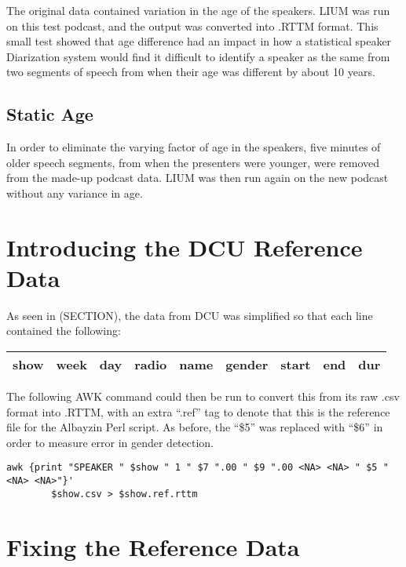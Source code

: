 The original data contained variation in the age of the speakers. LIUM was run on this test podcast, and the output was converted into .RTTM format. This small test showed that age difference had an impact in how a statistical speaker Diarization system would find it difficult to identify a speaker as the same from two segments of speech from when their age was different by about 10 years.

\subsection{Static Age}

In order to eliminate the varying factor of age in the speakers, five minutes of older speech segments, from when the presenters were younger, were removed from the made-up podcast data. LIUM was then run again on the new podcast without any variance in age.

\section{Introducing the DCU Reference Data}

As seen in (SECTION), the data from DCU was simplified so that each line contained the following:

\bgroup
\singlespacing
\def\arraystretch{1.5}
\begin{center}
\begin{tabular}{| c | c | c | c | c | c | c | c | c |}
\hline
 show & week & day & radio & name & gender & start & end & dur \\
\hline
\end{tabular}
\end{center}
\egroup

\noindent The following AWK command could then be run to convert this from its raw .csv format into .RTTM, with an extra ``.ref'' tag to denote that this is the reference file for the Albayzin Perl script. As before, the ``\$5'' was replaced with ``\$6'' in order to measure error in gender detection.

\begin{lstlisting}
awk {print "SPEAKER " $show " 1 " $7 ".00 " $9 ".00 <NA> <NA> " $5 " <NA> <NA>"}'
		$show.csv > $show.ref.rttm
\end{lstlisting}

\noindent 

\section{Fixing the Reference Data}

